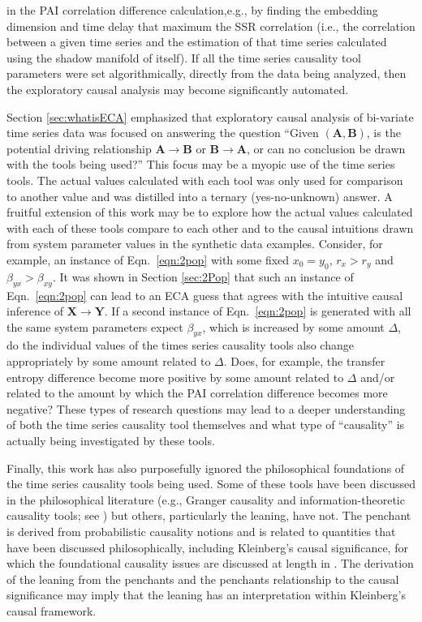 in the PAI correlation difference calculation,e.g., by finding the embedding dimension and time delay that maximum the SSR correlation (i.e., the correlation between a given time series and the estimation of that time series calculated using the shadow manifold of itself).  If all the time series causality tool parameters were set algorithmically, directly from the data being analyzed, then the exploratory causal analysis may become significantly automated. 

Section \ref{sec:whatisECA} emphasized that exploratory causal analysis of bi-variate time series data was focused on answering the question ``Given $(\mathbf{A},\mathbf{B})$, is the potential driving relationship $\mathbf{A}\rightarrow\mathbf{B}$ or $\mathbf{B}\rightarrow\mathbf{A}$, or can no conclusion be drawn with the tools being used?''  This focus may be a myopic use of the time series tools.  The actual values calculated with each tool was only used for comparison to another value and was distilled into a ternary (yes-no-unknown) answer.  A fruitful extension of this work may be to explore how the actual values calculated with each of these tools compare to each other and to the causal intuitions drawn from system parameter values in the synthetic data examples.  Consider, for example, an instance of Eqn.\ \ref{eqn:2pop} with some fixed $x_0=y_0$, $r_x>r_y$ and $\beta_{yx}>\beta_{xy}$.  It was shown in Section \ref{sec:2Pop} that such an instance of Eqn.\ \ref{eqn:2pop} can lead to an ECA guess that agrees with the intuitive causal inference of $\mathbf{X}\rightarrow\mathbf{Y}$.  If a second instance of Eqn.\ \ref{eqn:2pop} is generated with all the same system parameters expect $\beta_{yx}$, which is increased by some amount $\Delta$, do the individual values of the times series causality tools also change appropriately by some amount related to $\Delta$.  Does, for example, the transfer entropy difference become more positive by some amount related to $\Delta$ and/or related to the amount by which the PAI correlation difference becomes more negative?  These types of research questions may lead to a deeper understanding of both the time series causality tool themselves and what type of ``causality'' is actually being investigated by these tools.

Finally, this work has also purposefully ignored the philosophical foundations of the time series causality tools being used.  Some of these tools have been discussed in the philosophical literature (e.g., Granger causality and information-theoretic causality tools; see \cite{Illari2014}) but others, particularly the leaning, have not.  The penchant is derived from probabilistic causality notions and is related to quantities that have been discussed philosophically, including Kleinberg's causal significance, for which the foundational causality issues are discussed at length in \cite{Kleinberg2012}.  The derivation of the leaning from the penchants and the penchants relationship to the causal significance may imply that the leaning has an interpretation within Kleinberg's causal framework.